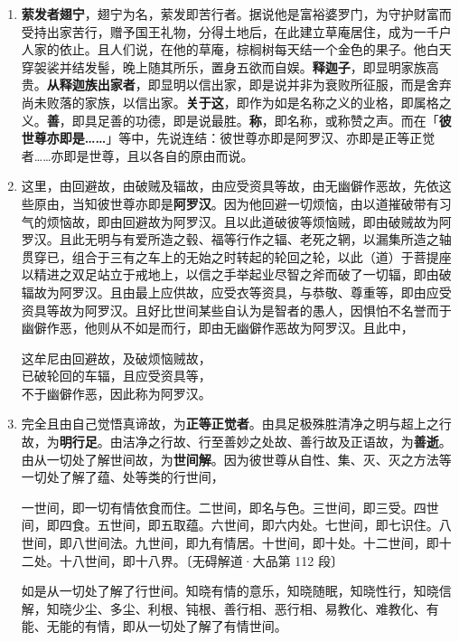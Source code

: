 \begin{enumerate}\item \textbf{萦发者翅宁}，翅宁为名，萦发即苦行者。据说他是富裕婆罗门，为守护财富而受持出家苦行，赠予国王礼物，分得土地后，在此建立草庵居住，成为一千户人家的依止。且人们说，在他的草庵，棕榈树每天结一个金色的果子。他白天穿袈裟并结发髻，晚上随其所乐，置身五欲而自娱。\textbf{释迦子}，即显明家族高贵。\textbf{从释迦族出家者}，即显明以信出家，即是说并非为衰败所征服，而是舍弃尚未败落的家族，以信出家。\textbf{关于这}，即作为如是名称之义的业格，即属格之义。\textbf{善}，即具足善的功德，即是说最胜。\textbf{称}，即名称，或称赞之声。而在「\textbf{彼世尊亦即是……}」等中，先说连结：彼世尊亦即是阿罗汉、亦即是正等正觉者……亦即是世尊，且以各自的原由而说。
\item 这里，由回避故，由破贼及辐故，由应受资具等故，由无幽僻作恶故，先依这些原由，当知彼世尊亦即是\textbf{阿罗汉}。因为他回避一切烦恼，由以道摧破带有习气的烦恼故，即由回避故为阿罗汉。且以此道破彼等烦恼贼，即由破贼故为阿罗汉。且此无明与有爱所造之毂、福等行作之辐、老死之辋，以漏集所造之轴贯穿已，组合于三有之车上的无始之时转起的轮回之轮，以此（道）于菩提座以精进之双足站立于戒地上，以信之手举起业尽智之斧而破了一切辐，即由破辐故为阿罗汉。且由最上应供故，应受衣等资具，与恭敬、尊重等，即由应受资具等故为阿罗汉。且好比世间某些自认为是智者的愚人，因惧怕不名誉而于幽僻作恶，他则从不如是而行，即由无幽僻作恶故为阿罗汉。且此中，\begin{quoting}这牟尼由回避故，及破烦恼贼故，\\已破轮回的车辐，且应受资具等，\\不于幽僻作恶，因此称为阿罗汉。\end{quoting}
\item 完全且由自己觉悟真谛故，为\textbf{正等正觉者}。由具足极殊胜清净之明与超上之行故，为\textbf{明行足}。由洁净之行故、行至善妙之处故、善行故及正语故，为\textbf{善逝}。由从一切处了解世间故，为\textbf{世间解}。因为彼世尊从自性、集、灭、灭之方法等一切处了解了蕴、处等类的行世间，\begin{quoting}一世间，即一切有情依食而住。二世间，即名与色。三世间，即三受。四世间，即四食。五世间，即五取蕴。六世间，即六内处。七世间，即七识住。八世间，即八世间法。九世间，即九有情居。十世间，即十处。十二世间，即十二处。十八世间，即十八界。{\bluefootnotesize 〔无碍解道·大品第 112 段〕}\end{quoting}如是从一切处了解了行世间。知晓有情的意乐，知晓随眠，知晓性行，知晓信解，知晓少尘、多尘、利根、钝根、善行相、恶行相、易教化、难教化、有能、无能的有情，即从一切处了解了有情世间。

\end{enumerate}
